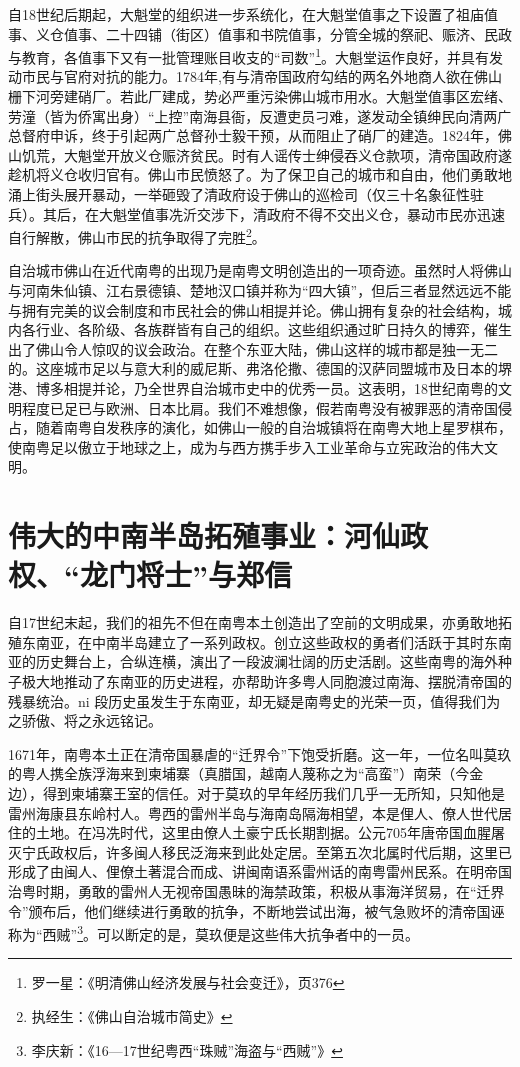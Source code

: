 自18世纪后期起，大魁堂的组织进一步系统化，在大魁堂值事之下设置了祖庙值事、义仓值事、二十四铺（街区）值事和书院值事，分管全城的祭祀、赈济、民政与教育，各值事下又有一批管理账目收支的“司数”\footnote{罗一星：《明清佛山经济发展与社会变迁》，页376}。大魁堂运作良好，并具有发动市民与官府对抗的能力。1784年,有与清帝国政府勾结的两名外地商人欲在佛山栅下河旁建硝厂。若此厂建成，势必严重污染佛山城市用水。大魁堂值事区宏绪、劳潼（皆为侨寓出身）“上控”南海县衙，反遭吏员刁难，遂发动全镇绅民向清两广总督府申诉，终于引起两广总督孙士毅干预，从而阻止了硝厂的建造。1824年，佛山饥荒，大魁堂开放义仓赈济贫民。时有人谣传士绅侵吞义仓款项，清帝国政府遂趁机将义仓收归官有。佛山市民愤怒了。为了保卫自己的城市和自由，他们勇敢地涌上街头展开暴动，一举砸毁了清政府设于佛山的巡检司（仅三十名象征性驻兵）。其后，在大魁堂值事冼沂交涉下，清政府不得不交出义仓，暴动市民亦迅速自行解散，佛山市民的抗争取得了完胜\footnote{执经生：《佛山自治城市简史》}。

自治城市佛山在近代南粤的出现乃是南粤文明创造出的一项奇迹。虽然时人将佛山与河南朱仙镇、江右景德镇、楚地汉口镇并称为“四大镇”，但后三者显然远远不能与拥有完美的议会制度和市民社会的佛山相提并论。佛山拥有复杂的社会结构，城内各行业、各阶级、各族群皆有自己的组织。这些组织通过旷日持久的博弈，催生出了佛山令人惊叹的议会政治。在整个东亚大陆，佛山这样的城市都是独一无二的。这座城市足以与意大利的威尼斯、弗洛伦撒、德国的汉萨同盟城市及日本的堺港、博多相提并论，乃全世界自治城市史中的优秀一员。这表明，18世纪南粤的文明程度已足已与欧洲、日本比肩。我们不难想像，假若南粤没有被罪恶的清帝国侵占，随着南粤自发秩序的演化，如佛山一般的自治城镇将在南粤大地上星罗棋布，使南粤足以傲立于地球之上，成为与西方携手步入工业革命与立宪政治的伟大文明。

\section{伟大的中南半岛拓殖事业：河仙政权、“龙门将士”与郑信}

\indent 自17世纪末起，我们的祖先不但在南粤本土创造出了空前的文明成果，亦勇敢地拓殖东南亚，在中南半岛建立了一系列政权。创立这些政权的勇者们活跃于其时东南亚的历史舞台上，合纵连横，演出了一段波澜壮阔的历史活剧。这些南粤的海外种子极大地推动了东南亚的历史进程，亦帮助许多粤人同胞渡过南海、摆脱清帝国的残暴统治。ni 段历史虽发生于东南亚，却无疑是南粤史的光荣一页，值得我们为之骄傲、将之永远铭记。

1671年，南粤本土正在清帝国暴虐的“迁界令”下饱受折磨。这一年，一位名叫莫玖的粤人携全族浮海来到柬埔寨（真腊国，越南人蔑称之为“高蛮”）南荣（今金边），得到柬埔寨王室的信任。对于莫玖的早年经历我们几乎一无所知，只知他是雷州海康县东岭村人。粤西的雷州半岛与海南岛隔海相望，本是俚人、僚人世代居住的土地。在冯冼时代，这里由僚人土豪宁氏长期割据。公元705年唐帝国血腥屠灭宁氏政权后，许多闽人移民泛海来到此处定居。至第五次北属时代后期，这里已形成了由闽人、俚僚土著混合而成、讲闽南语系雷州话的南粤雷州民系。在明帝国治粤时期，勇敢的雷州人无视帝国愚昧的海禁政策，积极从事海洋贸易，在“迁界令”颁布后，他们继续进行勇敢的抗争，不断地尝试出海，被气急败坏的清帝国诬称为“西贼”\footnote{李庆新：《16—17世纪粤西“珠贼”海盗与“西贼”》}。可以断定的是，莫玖便是这些伟大抗争者中的一员。

